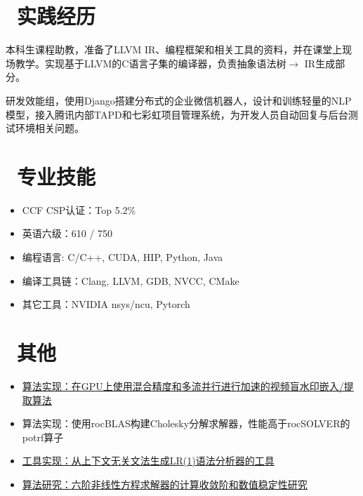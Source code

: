 \documentclass{resume}
\begin{document}
\begin{onehalfspacing}
\end{onehalfspacing}

\section{\faUsers\ 实践经历}

\vspace*{0.3em}
本科生课程助教，准备了LLVM IR、编程框架和相关工具的资料，并在课堂上现场教学。实现基于LLVM的C语言子集的编译器，负责抽象语法树$\to$ IR生成部分。

\vspace*{0.3em}
研发效能组，使用Django搭建分布式的企业微信机器人，设计和训练轻量的NLP模型，接入腾讯内部TAPD和七彩虹项目管理系统，为开发人员自动回复与后台测试环境相关问题。



\section{\faCogs\ 专业技能}
\begin{itemize}[parsep=0.5ex]
  \item CCF CSP认证：Top 5.2\%
  \item 英语六级：610 / 750
  \item 编程语言: C/C++, CUDA, HIP, Python, Java
  \item 编译工具链：Clang, LLVM, GDB, NVCC, CMake
  \item 其它工具：NVIDIA nsys/ncu, Pytorch
\end{itemize}
\section{\faInfo\ 其他}
\begin{itemize}[parsep=0.5ex]
  \item \href{https://github.com/Zeege-0/Info-Security-Homework/}{算法实现：在GPU上使用混合精度和多流并行进行加速的视频盲水印嵌入/提取算法}
  \item 算法实现：使用rocBLAS构建Cholesky分解求解器，性能高于rocSOLVER的potrf算子
  \item \href{https://gitee.com/zeege/my-parser-generator}{工具实现：从上下文无关文法生成LR(1)语法分析器的工具}
  \item \href{https://github.com/Zeege-0/numerical-analysis-homework}{算法研究：六阶非线性方程求解器的计算收敛阶和数值稳定性研究}
\end{itemize}

%
%
\end{document}
